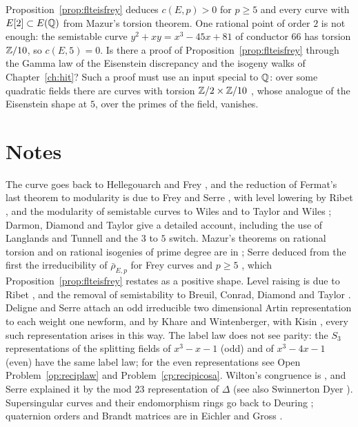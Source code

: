 \begin{problem}\label{op:fltmazur}
Proposition~\ref{prop:flteisfrey} deduces $c(E,p)>0$ for $p\ge5$ and every curve with $E[2]\subset E(\mathbb{Q})$ from Mazur's torsion theorem. One rational point of order $2$ is not enough: the semistable curve $y^2+xy=x^3-45x+81$ of conductor $66$ has torsion $\mathbb{Z}/10$, so $c(E,5)=0$. Is there a proof of Proposition~\ref{prop:flteisfrey} through the Gamma law of the Eisenstein discrepancy and the isogeny walks of Chapter~\ref{ch:hit}? Such a proof must use an input special to $\mathbb{Q}$: over some quadratic fields there are curves with torsion $\mathbb{Z}/2\times\mathbb{Z}/10$ \cite{kenkumomose1988,kamienny1992,kamiennynajman2012}, whose analogue of the Eisenstein shape at $5$, over the primes of the field, vanishes.
\end{problem}

\section{Notes}

The curve goes back to Hellegouarch and Frey \cite{hellegouarch1975,frey1986}, and the reduction of Fermat's last theorem to modularity is due to Frey and Serre \cite{frey1986,serre1987}, with level lowering by Ribet \cite{ribet1990}, and the modularity of semistable curves to Wiles and to Taylor and Wiles \cite{wiles1995,taylorwiles1995}; Darmon, Diamond and Taylor \cite{ddt1995} give a detailed account, including the use of Langlands and Tunnell \cite{langlands1980,tunnell1981} and the $3$ to $5$ switch. Mazur's theorems on rational torsion and on rational isogenies of prime degree are in \cite{mazur1977,mazur1978}; Serre deduced from the first the irreducibility of $\bar\rho_{E,p}$ for Frey curves and $p\ge5$ \cite{serre1987}, which Proposition~\ref{prop:flteisfrey} restates as a positive shape. Level raising is due to Ribet \cite{ribet1984,ribet1990b}, and the removal of semistability to Breuil, Conrad, Diamond and Taylor \cite{bcdt2001}. Deligne and Serre \cite{deligneserre1974} attach an odd irreducible two dimensional Artin representation to each weight one newform, and by Khare and Wintenberger, with Kisin \cite{kharewintenberger2009,kharewintenberger2009b,kisin2009}, every such representation arises in this way. The label law does not see parity: the $S_3$ representations of the splitting fields of $x^3-x-1$ (odd) and of $x^3-4x-1$ (even) have the same label law; for the even representations see Open Problem~\ref{op:reciplaw} and Problem~\ref{cp:recipicosa}. Wilton's congruence is \cite{wilton1930}, and Serre \cite{serre1968b} explained it by the mod $23$ representation of $\Delta$ (see also Swinnerton Dyer \cite{swinnertondyer1973}). Supersingular curves and their endomorphism rings go back to Deuring \cite{deuring1941}; quaternion orders and Brandt matrices are in Eichler and Gross \cite{eichler1954,eichler1973,gross1987}.

